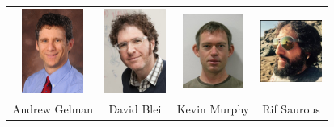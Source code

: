 \documentclass[10pt,
               xcolor={usenames,dvipsnames},
               hyperref={colorlinks,linktoc=all,citecolor=Plum,linkcolor=MidnightBlue,urlcolor=MidnightBlue},noamssymb]{beamer}
\begin{document}
\begin{frame}[plain]
\begin{center}
\vspace{-2ex}

\begin{tabular}{cccc}
\includegraphics[width=20mm]{img/gelman.png} &
\includegraphics[width=20mm]{img/blei.jpg} &
\includegraphics[width=20mm]{img/kevin.jpg} &
\includegraphics[width=20mm]{img/rif.png}\\
Andrew Gelman & David Blei & Kevin Murphy & Rif Saurous\\
\end{tabular}
\end{center}
\end{frame}
\end{document}
